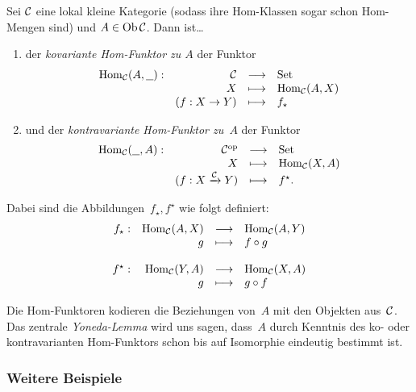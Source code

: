 \begin{defn}\label{defhomfunktor}%
Sei $\mathcal{C}$ eine lokal kleine Kategorie (sodass ihre Hom-Klassen sogar schon
Hom-Mengen sind) und $A \in \operatorname{Ob} \mathcal{C}$. Dann ist\ldots
\begin{enumerate}
  \item der \emph{kovariante Hom-Funktor zu $A$} der Funktor
    \[ \begin{array}{@{}rrcl@{}}
      \Hom_\C(A,\freist): & \C &\longrightarrow& \Set \\
      & X &\longmapsto& \Hom_\C(A,X) \\
      & (f:X \to Y) &\longmapsto& f_\star
    \end{array} \]
  \item und der \emph{kontravariante Hom-Funktor zu~$A$} der Funktor
    \[ \begin{array}{@{}rrcl@{}}
      \Hom_\C(\freist,A): & \C^\op &\longrightarrow& \Set \\
      & X &\longmapsto& \Hom_\C(X,A) \\
      & (f:X \xra{\C} Y) &\longmapsto& f^\star.
    \end{array} \]
\end{enumerate}
Dabei sind die Abbildungen~$f_\star, f^\star$ wie folgt definiert:
\[ \begin{array}{@{}rrcl@{}}
  f_\star: & \Hom_\C(A,X) &\longrightarrow& \Hom_\C(A,Y) \\
  & g &\longmapsto& f \circ g \\
  \\
  f^\star: & \Hom_\C(Y,A) &\longrightarrow& \Hom_\C(X,A) \\
  & g &\longmapsto& g \circ f
\end{array} \]
\end{defn}

Die Hom-Funktoren kodieren die Beziehungen von~$A$ mit den Objekten aus~$\mathcal{C}$.
Das zentrale \emph{Yoneda-Lemma} wird uns sagen, dass~$A$ durch Kenntnis des
ko- oder kontravarianten Hom-Funktors schon bis auf Isomorphie eindeutig
bestimmt ist.


\subsubsection{Weitere Beispiele}

